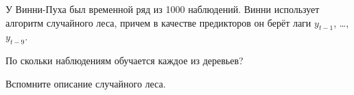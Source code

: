 
\begin{question}
У Винни-Пуха был временной ряд из 1000 наблюдений.
Винни использует алгоритм случайного леса, причем в качестве предикторов он берёт лаги \(y_{t-1}\), \ldots, \(y_{t - 9}\).

По скольки наблюдениям обучается каждое из деревьев?
\end{question}

\begin{solution}
Вспомните описание случайного леса.
\end{solution}

